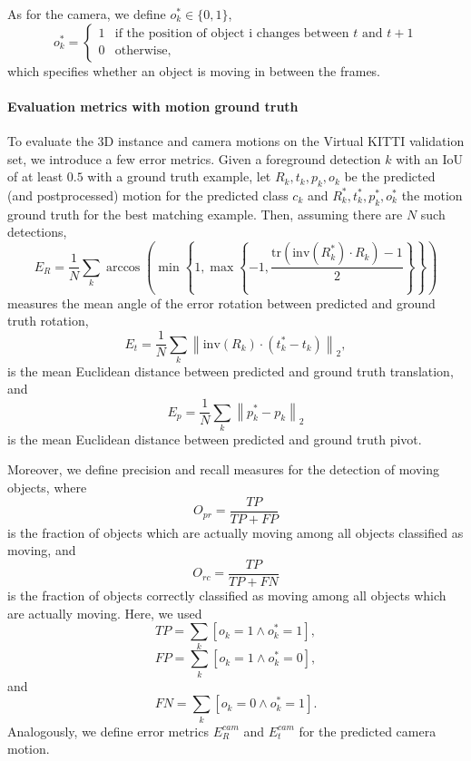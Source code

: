 As for the camera, we define $o_k^* \in \{ 0, 1 \}$,
\begin{equation}
o_k^* =
\begin{cases}
1 &\text{if the position of object i changes between $t$ and $t+1$} \\
0 &\text{otherwise,}
\end{cases}
\end{equation}
which specifies whether an object is moving in between the frames.

\paragraph{Evaluation metrics with motion ground truth}
To evaluate the 3D instance and camera motions on the Virtual KITTI validation
set, we introduce a few error metrics.
Given a foreground detection $k$ with an IoU of at least $0.5$ with a ground truth example,
let $R_k, t_k, p_k, o_k$ be the predicted (and postprocessed) motion for the predicted class $c_k$
and $R_k^*, t_k^*, p_k^*, o_k^*$ the motion ground truth for the best matching example.
Then, assuming there are $N$ such detections,
\begin{equation}
E_{R} = \frac{1}{N}\sum_k \arccos\left( \min\left\{1, \max\left\{-1, \frac{\mathrm{tr}(\mathrm{inv}(R_k^*) \cdot R_k) - 1}{2} \right\}\right\} \right)
\end{equation}
measures the mean angle of the error rotation between predicted and ground truth rotation,
\begin{equation}
E_{t} = \frac{1}{N}\sum_k  \left\lVert \mathrm{inv}(R_k) \cdot (t_k^* - t_k) \right\rVert_2,
\end{equation}
is the mean Euclidean distance between predicted and ground truth translation, and
\begin{equation}
E_{p} = \frac{1}{N}\sum_k \left\lVert p_k^* - p_k \right\rVert_2
\end{equation}
is the mean Euclidean distance between predicted and ground truth pivot.

Moreover, we define precision and recall measures for the detection of moving objects,
where
\begin{equation}
O_{pr} = \frac{\mathit{TP}}{\mathit{TP} + \mathit{FP}}
\end{equation}
is the fraction of objects which are actually moving among all objects classified as moving,
and
\begin{equation}
O_{rc} = \frac{\mathit{TP}}{\mathit{TP} + \mathit{FN}}
\end{equation}
is the fraction of objects correctly classified as moving among all objects which are actually moving.
Here, we used
\begin{equation}
\mathit{TP} = \sum_k [o_k = 1 \land o_k^* = 1],
\end{equation}
\begin{equation}
\mathit{FP} = \sum_k [o_k = 1 \land o_k^* = 0],
\end{equation}
and
\begin{equation}
\mathit{FN} = \sum_k [o_k = 0 \land o_k^* = 1].
\end{equation}
Analogously, we define error metrics $E_{R}^{cam}$ and $E_{t}^{cam}$ for
the predicted camera motion.

